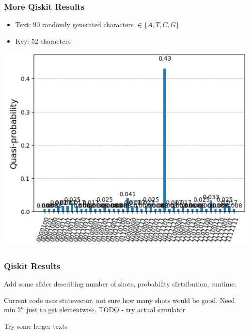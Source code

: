 \documentclass[
	11pt, %
]{beamer}
\begin{document}

\begin{frame}
    \frametitle{More Qiskit Results}
    \begin{itemize}
        \item Text: 90 randomly generated characters $\in \{A,T,C,G\}$
        \item Key: 52 characters
    \end{itemize}

    \begin{center}
        \includegraphics[scale=0.5]{aer_stress_test.png}
    \end{center}
\end{frame}


\begin{frame}
    \frametitle{Qiskit Results}
    Add some slides describing number of shots, probability distribution, runtime.

    \bigskip
    Current code uses statevector, not sure how many shots would be good. Need min $2^n$ just to get elementwise. TODO - try actual simulator
    
    \bigskip
    Try some larger texts
\end{frame}

\end{document}
